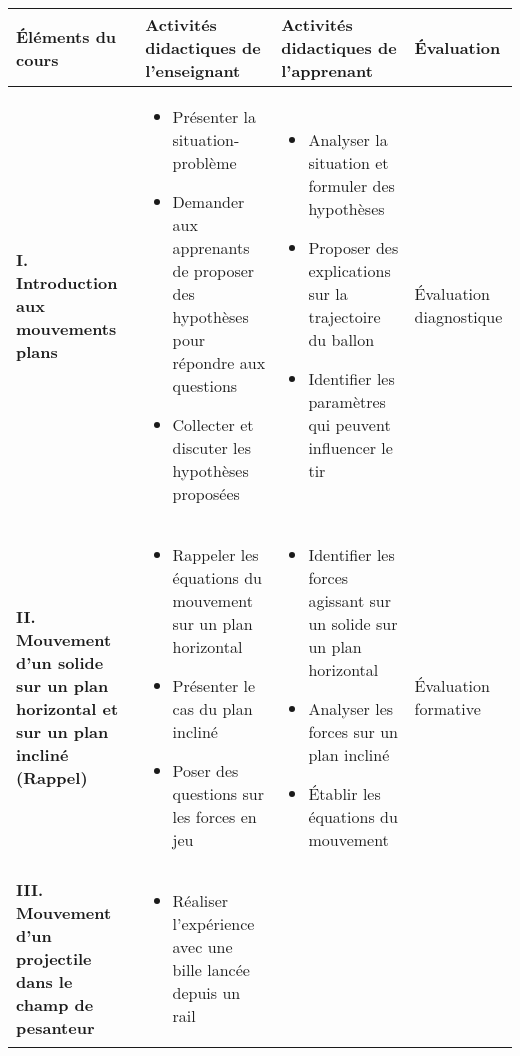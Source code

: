 \documentclass[12pt]{article}
\begin{document}
\vspace{1cm}

\begin{table}[htbp]
\centering
\begin{tabular}{|p{4cm}|p{5.5cm}|p{5.5cm}|p{1.5cm}|}
\hline
\rowcolor{gray!30} \textbf{Éléments du cours} & \textbf{Activités didactiques de l'enseignant} & \textbf{Activités didactiques de l'apprenant} & \textbf{Évaluation} \\
\hline
\textbf{I. Introduction aux mouvements plans} & 
\begin{itemize}
    \item Présenter la situation-problème 
    \item Demander aux apprenants de proposer des hypothèses pour répondre aux questions
    \item Collecter et discuter les hypothèses proposées
\end{itemize} & 
\begin{itemize}
    \item Analyser la situation et formuler des hypothèses
    \item Proposer des explications sur la trajectoire du ballon
    \item Identifier les paramètres qui peuvent influencer le tir
\end{itemize} &
Évaluation diagnostique \\
\hline
\textbf{II. Mouvement d'un solide sur un plan horizontal et sur un plan incliné (Rappel)} & 
\begin{itemize}
    \item Rappeler les équations du mouvement sur un plan horizontal
    \item Présenter le cas du plan incliné
    \item Poser des questions sur les forces en jeu
\end{itemize} & 
\begin{itemize}
    \item Identifier les forces agissant sur un solide sur un plan horizontal
    \item Analyser les forces sur un plan incliné
    \item Établir les équations du mouvement
\end{itemize} &
Évaluation formative \\
\hline
\textbf{III. Mouvement d'un projectile dans le champ de pesanteur} &
\begin{itemize}
    \item Réaliser l'expérience avec une bille lancée depuis un rail

\end{itemize}
\end{tabular}
\end{table}
\end{document}
